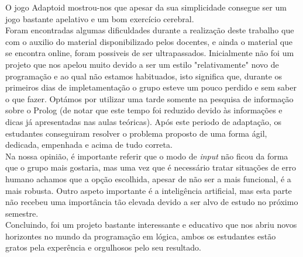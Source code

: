 \documentclass[a4paper]{article}
\begin{document}
O jogo Adaptoid mostrou-nos que apesar da sua simplicidade consegue ser um jogo bastante apelativo e um bom exercício cerebral.
\\

Foram encontradas algumas dificuldades durante a realização deste trabalho que com o auxilio do material disponibilizado pelos docentes, e ainda o material que se encontra online, foram possiveis de ser ultrapassados. Inicialmente não foi um projeto que nos apelou muito devido a ser um estilo "relativamente" novo de programação e ao qual não estamos habituados, isto significa que, durante os primeiros dias de impletamentação o grupo esteve um pouco perdido e sem saber o que fazer. Optámos por utilizar uma tarde somente na pesquisa de informação sobre o Prolog (de notar que este tempo foi reduzido devido às informações e dicas já apresentadas nas aulas teóricas). Após este periodo de adaptação, os estudantes conseguiram resolver o problema proposto de uma forma ágil, dedicada, empenhada e acima de tudo correta.
\\

Na nossa opinião, é importante referir que o modo de \textit{input} não ficou da forma que o grupo mais gostaria, mas uma vez que é necessário tratar situações de erro humano achamos que a opção escolhida, apesar de não ser a mais funcional, é a mais robusta. Outro aspeto importante é a inteligência artificial, mas esta parte não recebeu uma importância tão elevada devido a ser alvo de estudo no próximo semestre.
\\

Concluindo, foi um projeto bastante interessante e educativo que nos abriu novos horizontes no mundo da programação em lógica, ambos os estudantes estão gratos pela experência e orgulhosos pelo seu resultado.

\clearpage
%
%

\newpage
\appendix
\end{document}
